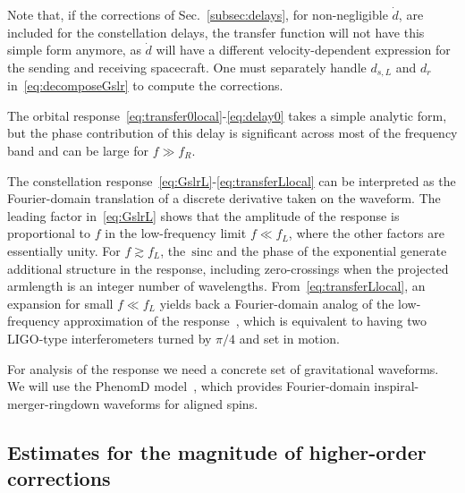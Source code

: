 \documentclass[aps,showpacs,twocolumn,
prd,superscriptaddress,nofootinbib]{revtex4-1}
\newcommand{\sinc}{\,\mathrm{sinc}}
\newcommand{\jgb}[1]{{\color{DarkGreen} #1}}
\begin{document}
Note that, if the corrections of Sec.~\ref{subsec:delays}, \jgb{for non-negligible $\dot d$}, are included for the constellation delays, the transfer function will not have this simple form anymore, as $\dot{d}$ will have a different velocity-dependent expression for the sending and receiving spacecraft. One must \jgb{separately handle $d_{s,L}$ and $d_{r}$ in~\eqref{eq:decomposeGslr} to compute the corrections.}

The \jgb{orbital} response~\eqref{eq:transfer0local}-\eqref{eq:delay0} takes a simple analytic form, but the phase contribution of this delay is significant across most of the frequency band and can be large for $f \gg f_{R}$.

The \jgb{constellation} response~\eqref{eq:GslrL}-\eqref{eq:transferLlocal} can be interpreted as the Fourier-domain translation of a discrete derivative taken on the waveform. The \jgb{leading factor in~\eqref{eq:GslrL}} shows that the amplitude of the response is proportional to $f$ in the low-frequency limit $f\ll f_{L}$, where the other factors are essentially unity. For $f\gtrsim f_{L}$, the $\sinc$ and the phase of the exponential generate additional structure in the response, including zero-crossings when the projected armlength \jgb{is an integer number of wavelengths}. From~\eqref{eq:transferLlocal}, an expansion for small $f\ll f_{L}$ yields back a Fourier-domain analog of the low-frequency approximation of the response~\cite{Cutler97, RCP04}, which \jgb{is equivalent to} having two LIGO-type interferometers turned by $\pi/4$ and set in motion.

For analysis of the response we need a concrete set of gravitational waveforms. We will use the PhenomD model~\cite{Khan+15,Husa+15}, which provides Fourier-domain inspiral-merger-ringdown waveforms for aligned spins.


\subsection{Estimates for the magnitude of higher-order corrections}
\label{subsec:lisafom}
\end{document}
